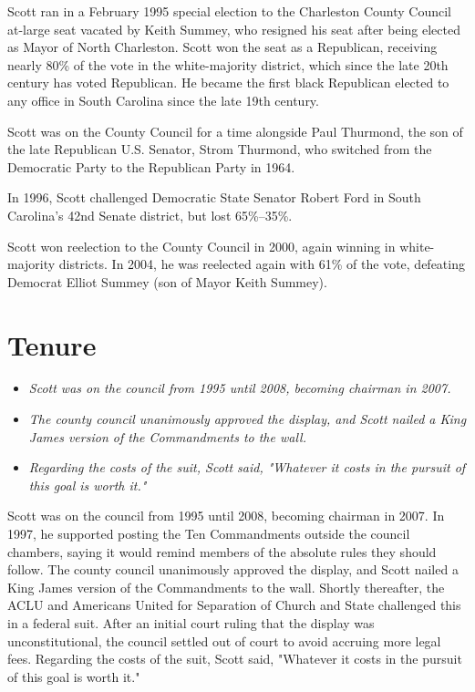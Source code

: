 Scott ran in a February 1995 special election to the Charleston County
Council at-large seat vacated by Keith Summey, who resigned his seat
after being elected as Mayor of North Charleston. Scott won the seat as
a Republican, receiving nearly 80\% of the vote in the white-majority
district, which since the late 20th century has voted Republican. He
became the first black Republican elected to any office in South
Carolina since the late 19th century.

Scott was on the County Council for a time alongside Paul Thurmond, the
son of the late Republican U.S. Senator, Strom Thurmond, who switched
from the Democratic Party to the Republican Party in 1964.

In 1996, Scott challenged Democratic State Senator Robert Ford in South
Carolina's 42nd Senate district, but lost 65\%--35\%.

Scott won reelection to the County Council in 2000, again winning in
white-majority districts. In 2004, he was reelected again with 61\% of
the vote, defeating Democrat Elliot Summey (son of Mayor Keith Summey).

\section{Tenure}\label{tenure}

\begin{itemize}
\item
  \emph{Scott was on the council from 1995 until 2008, becoming chairman
  in 2007.}
\item
  \emph{The county council unanimously approved the display, and Scott
  nailed a King James version of the Commandments to the wall.}
\item
  \emph{Regarding the costs of the suit, Scott said, "Whatever it costs
  in the pursuit of this goal is worth it."}
\end{itemize}

Scott was on the council from 1995 until 2008, becoming chairman in
2007. In 1997, he supported posting the Ten Commandments outside the
council chambers, saying it would remind members of the absolute rules
they should follow. The county council unanimously approved the display,
and Scott nailed a King James version of the Commandments to the wall.
Shortly thereafter, the ACLU and Americans United for Separation of
Church and State challenged this in a federal suit. After an initial
court ruling that the display was unconstitutional, the council settled
out of court to avoid accruing more legal fees. Regarding the costs of
the suit, Scott said, "Whatever it costs in the pursuit of this goal is
worth it."

